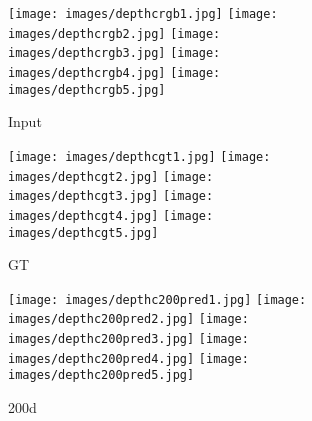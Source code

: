 \documentclass[5p]{elsarticle}
\begin{document}
\begin{figure}[]
     \centering
         \begin{subfigure}[t]{0.11\textwidth}
         \centering
         \caption{Input}
         \texttt{[image: images/depthcrgb1.jpg]}
         \hspace{1em}
         \texttt{[image: images/depthcrgb2.jpg]}
         \hspace{1em}
         \texttt{[image: images/depthcrgb3.jpg]}
         \hspace{1em}
         \texttt{[image: images/depthcrgb4.jpg]}
         \hspace{1em}
         \texttt{[image: images/depthcrgb5.jpg]}
         \label{kittilidarsubfig0:rgb}
     \end{subfigure}
          \begin{subfigure}[t]{0.11\textwidth}
         \centering
         \caption{GT}
         \texttt{[image: images/depthcgt1.jpg]}
         \hspace{1em}
         \texttt{[image: images/depthcgt2.jpg]}
         \hspace{1em}
         \texttt{[image: images/depthcgt3.jpg]}
         \hspace{1em}
         \texttt{[image: images/depthcgt4.jpg]}
         \hspace{1em}
         \texttt{[image: images/depthcgt5.jpg]}
         \label{kittilidarsubfig0:gt}
     \end{subfigure}
     \begin{subfigure}[t]{0.11\textwidth}
         \centering
         \caption{200d}
         \texttt{[image: images/depthc200pred1.jpg]}
         \hspace{1em}
         \texttt{[image: images/depthc200pred2.jpg]}
         \hspace{1em}
         \texttt{[image: images/depthc200pred3.jpg]}
         \hspace{1em}
         \texttt{[image: images/depthc200pred4.jpg]}
         \hspace{1em}
         \texttt{[image: images/depthc200pred5.jpg]}
         \label{kittilidarsubfig0:200}
     \end{subfigure}
         \begin{subfigure}[t]{0.11\textwidth}

\end{subfigure}
\end{figure}
\end{document}
